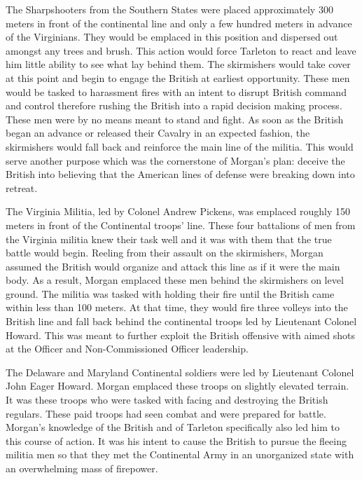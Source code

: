 The Sharpshooters from the Southern States were placed approximately 300 meters
in front of the continental line \cite[p.48]{moncure_cowpens_1996} and only a few hundred meters
in advance of the Virginians.  They would be emplaced in this position and
dispersed out amongst any trees and brush.   This action would force Tarleton to
react and leave him little ability to see what lay behind them.  The skirmishers
would take cover at this point and begin to engage the British at earliest
opportunity.  These men would be tasked to harassment fires with an intent to
disrupt British command and control therefore rushing the British into a rapid
decision making process.  These men were by no means meant to stand and fight.
As soon as the British began an advance or released their Cavalry in an expected
fashion, the skirmishers would fall back and reinforce the main line of the
militia.  This would serve another purpose which was the cornerstone of Morgan's
plan: deceive the British into believing that the American lines of defense were
breaking down into retreat.

The Virginia Militia, led by Colonel Andrew Pickens, was emplaced roughly 150
meters in front of the Continental troops' line.  These four battalions of men
from the Virginia militia knew their task well and it was with them that the
true battle would begin.  Reeling from their assault on the skirmishers, Morgan
assumed the British would organize and attack this line as if it were the main
body.  As a result, Morgan emplaced these men behind the skirmishers on level
ground.  The militia was tasked with holding their fire until the British came
within less than 100 meters.  At that time, they would fire three volleys into
the British line and fall back behind the continental troops led by Lieutenant
Colonel Howard.  This was meant to further exploit the British offensive with
aimed shots at the Officer and Non-Commissioned Officer leadership.  

The Delaware and Maryland Continental soldiers were led by Lieutenant Colonel
John Eager Howard.  Morgan emplaced these troops on slightly elevated terrain.
It was these troops who were tasked with facing and destroying the British
regulars.  These paid troops had seen combat and were prepared for battle.
Morgan’s knowledge of the British and of Tarleton specifically also led him to
this course of action.  It was his intent to cause the British to pursue the
fleeing militia men so that they met the Continental Army in an unorganized
state with an overwhelming mass of firepower.

